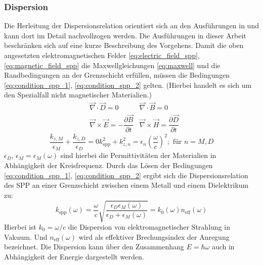 \documentclass[titlepage]{article}
\begin{document}
	\subsubsection{Dispersion}
	Die Herleitung der Dispersionsrelation orientiert sich an den Ausführungen in \cite[pp.~261--ff]{Fox.2020} und kann dort im Detail nachvollzogen werden. Die Ausführungen in dieser Arbeit beschränken sich auf eine kurze Beschreibung des Vorgehens.
	Damit die oben angesetzten elektromagnetischen Felder \eqref{eq:electric_field_spp}, \eqref{eq:magnetic_field_spp}  die Maxwellgleichungen \eqref{eq:maxwell} und die Randbedingungen an der Grenzschicht erfüllen, müssen die Bedingungen \eqref{eq:condition_spp_1},  \eqref{eq:condition_spp_2} gelten. (Hierbei handelt es sich um den Spezialfall nicht magnetischer Materialien.)
	\begin{align}
		\label{eq:maxwell}	
		&\vec{\nabla}\cdot\vec{D} = 0		&\vec{\nabla}\cdot\vec{B} = 0 \\
		&\vec{\nabla}\times\vec{E} = -\dfrac{\partial\vec{B}}{\partial t} 
		&\vec{\nabla}\times\vec{H} = 	\dfrac{\partial\vec{D}}{\partial t}\nonumber
	\end{align}
	\begin{subequations}
		\begin{equation}
			\label{eq:condition_spp_1}
			\dfrac{k_{z, M}}{\epsilon_M} + \dfrac{k_{z, D}}{\epsilon_D} = 0
		\end{equation}		
		\begin{equation}
			\label{eq:condition_spp_2}
			k_{\mathrm{spp}}^2 +k_{z, n}^2 = \epsilon_n\left(\dfrac{\omega}{c}\right)^2; \text{ für  } n=M,D
		\end{equation}
		\end{subequations}
		$\epsilon_D$, $\epsilon_M = \epsilon_M(\omega) $ sind hierbei die Permittivitäten der Materialien in Abhängigkeit der Kreisfrequenz.
		Durch das Lösen der Bedingungen \eqref{eq:condition_spp_1},  \eqref{eq:condition_spp_2} ergibt sich die Dispersionsrelation des SPP an einer Grenzschicht zwischen einem Metall und einem Dielektrikum zu: 
		\begin{equation}
			\label{eq:dispersion_spp}
			\boxed{
				k_{\mathrm{spp}}\left(\omega\right) = \dfrac{\omega}{c} \sqrt{\dfrac{\epsilon_D\epsilon_M(\omega)}{\epsilon_D + 	\epsilon_M(\omega)}}  = k_0(\omega) n_{\mathrm{eff}}(\omega)}
		\end{equation}
		Hierbei ist $k_0 = \omega / c$ die Dispersion von elektromagnetischer Strahlung in Vakuum. Und $n_{\mathrm{eff}}(\omega)$ wird als effektiver Brechungsindex der Anregung bezeichnet. Die Dispersion kann über den Zusammenhang $E = \hbar \omega$ auch in Abhängigkeit der Energie dargestellt werden.
		
\end{document}
